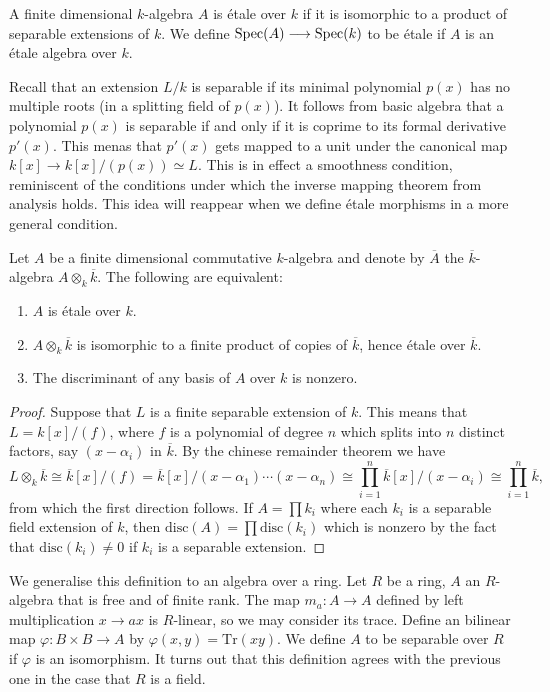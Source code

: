 \begin{definition}
  A finite dimensional $k$-algebra $A$ is \'etale over $k$ if it is isomorphic to a product of separable extensions of $k$. We define $\operatorname{Spec}(A) \longrightarrow \operatorname{Spec}(k)$ to be \'etale if $A$ is an \'etale algebra over $k$.
\end{definition}

Recall that an extension $L/k$ is separable if its minimal polynomial $p(x)$ has no multiple roots (in a splitting field of $p(x)$). It follows from basic algebra that a polynomial $p(x)$ is separable if and only if it is coprime to its formal derivative $p'(x)$. This menas that $p'(x)$ gets mapped to a unit under the canonical map $k[x] \to k[x]/(p(x)) \simeq L$. This is in effect a smoothness condition, reminiscent of the conditions under which the inverse mapping theorem from analysis holds. This idea will reappear when we define \'etale morphisms in a more general condition.

\begin{theorem}
  Let $A$ be a finite dimensional commutative $k$-algebra and denote by $\overline{A}$ the $\overline{k}$-algebra $A \otimes_k \overline{k}$. The following are equivalent:
  \begin{enumerate}
    \item $A$ is \'etale over $k$.\label{etale}
    \item $A \otimes_k \overline{k}$ is isomorphic to a finite product of copies of $\overline{k}$, hence \'etale over $\overline{k}$.\label{product}
    \item The discriminant of any basis of $A$ over $k$ is nonzero.\label{trace}
  \end{enumerate}
\end{theorem}
\begin{proof}
  Suppose that $L$ is a finite separable extension of $k$. This means that $L = k[x]/(f)$, where $f$ is a polynomial of degree $n$ which splits into $n$ distinct factors, say $(x-\alpha_i)$ in $\overline{k}$. By the chinese remainder theorem we have
  \[L \otimes_k \overline{k} \cong \overline{k}[x]/(f) = \overline{k}[x]/(x-\alpha_1)\cdots(x-\alpha_n) \cong \prod_{i=1}^n \overline{k}[x] / (x-\alpha_i) \cong \prod_{i=1}^n \overline{k},\] from which the first direction follows.
   If $A = \prod k_i$  where each $k_i$ is a separable field extension of $k$, then $\text{disc}(A) = \prod \text{disc}(k_i)$ which is nonzero by the fact that $\text{disc}(k_i) \neq 0$ if $k_i$ is a separable extension.
\end{proof}
We generalise this definition to an algebra over a ring. Let $R$ be a ring, $A$ an $R$-algebra that is free and of finite rank. The map $m_a: A \to A$ defined by left multiplication $x \to ax$ is $R$-linear, so we may consider its trace. Define an bilinear map $\varphi: B \times B \to A$ by $\varphi(x,y) = \text{Tr}(xy)$. We define $A$ to be separable over $R$ if $\varphi$ is an isomorphism. It turns out that this definition agrees with the previous one in the case that $R$ is a field.


